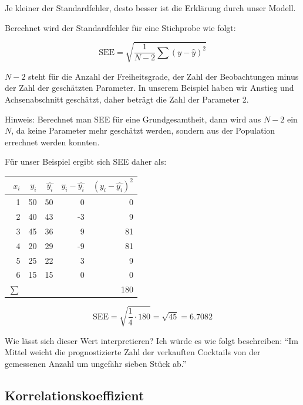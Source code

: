 \documentclass[ngerman, 12pt,parskip=half]{scrartcl}
\begin{document}
Je kleiner der Standardfehler, desto besser ist die Erklärung durch unser Modell. 

Berechnet wird der Standardfehler für eine Stichprobe wie folgt:

\begin{equation}
\text{SEE} = \sqrt{\frac{1}{N-2} \sum \left(y-\hat{y}\right)^2}
\end{equation}

\(N-2\) steht für die Anzahl der Freiheitsgrade, der Zahl der Beobachtungen minus der Zahl der geschätzten Parameter. In unserem Beispiel haben wir Anstieg und Achsenabschnitt geschätzt, daher beträgt die Zahl der Parameter 2. \clearpage

Hinweis: Berechnet man SEE für eine Grundgesamtheit, dann wird aus \(N-2\) ein \(N\), da keine Parameter mehr geschätzt werden, sondern aus der Population errechnet werden konnten.

Für unser Beispiel ergibt sich SEE daher als:

\begin{center}
\begin{tabular}{r|rrrr} \toprule
\(x_i\) & \(y_i\)  & \(\hat{y_i}\) & \(y_i-\hat{y_i}\) & \((y_i-\hat{y_i})^2\) \\ \midrule
1 & 50 & 50 & 0 & 0 \\
2 & 40 & 43 & -3 & 9 \\
3 & 45 & 36 & 9   & 81	\\
4 & 20 & 29 & -9 &  81 \\
5 & 25 & 22 & 3 & 9 \\
6 & 15 & 15 &  0 & 0\\ \midrule
\(\sum\) & & & & 180 \\ \bottomrule
\end{tabular}
\end{center}

\begin{equation}
\text{SEE} = \sqrt{ \frac{1}{4} \cdot 180} = \sqrt{45} = 6.7082
\end{equation}

Wie lässt sich dieser Wert interpretieren? Ich würde es wie folgt beschreiben: \enquote{Im Mittel weicht die prognostizierte Zahl der verkauften Cocktails von der gemessenen Anzahl um ungefähr sieben Stück ab.}

\subsection{Korrelationskoeffizient}
\end{document}
